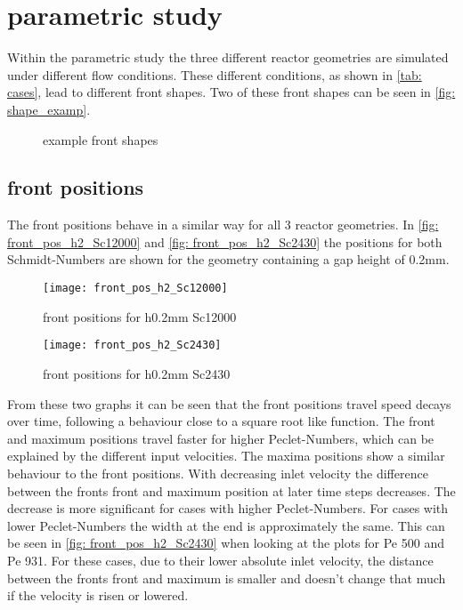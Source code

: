 \documentclass[../thesis.tex]{subfiles}
\begin{document}
\chapter{parametric study}
\label{chp: para_stud}
Within the parametric study the three different reactor geometries are simulated under different flow conditions. These different conditions, as shown in \autoref{tab: cases}, lead to different front shapes. Two of these front shapes can be seen in \autoref{fig: shape_examp}.
\begin{figure}[htb]
	\centering
	\qquad
	\caption{example front shapes}%
	\label{fig: shape_examp}%
\end{figure}

\section{front positions}

The front positions behave in a similar way for all 3 reactor geometries. In \autoref{fig: front_pos_h2_Sc12000} and \autoref{fig: front_pos_h2_Sc2430} the positions for both Schmidt-Numbers are shown for the geometry containing a gap height of 0.2mm.
\begin{figure}[htbp]
	\centering
	\texttt{[image: front\_pos\_h2\_Sc12000]}
	\caption{front positions for h0.2mm Sc12000\label{fig: front_pos_h2_Sc12000}}\bigskip
	\texttt{[image: front\_pos\_h2\_Sc2430]}
	\caption{front positions for h0.2mm Sc2430\label{fig: front_pos_h2_Sc2430}}
\end{figure}

From these two graphs it can be seen that the front positions travel speed decays over time, following a behaviour close to a  square root like function. The front and maximum positions travel faster for higher Peclet-Numbers, which can be explained by the different input velocities. The maxima positions show a similar behaviour to the front positions. 
With decreasing inlet velocity the difference between the fronts front and maximum position at later time steps decreases. The decrease is more significant for cases with higher Peclet-Numbers. For cases with lower Peclet-Numbers the width at the end is approximately the same. This can be seen in \autoref{fig: front_pos_h2_Sc2430} when looking at the plots for Pe 500 and Pe 931. For these cases, due to their lower absolute inlet velocity, the distance between the fronts front and maximum is smaller and doesn't change that much if the velocity is risen or lowered.
\end{document}

